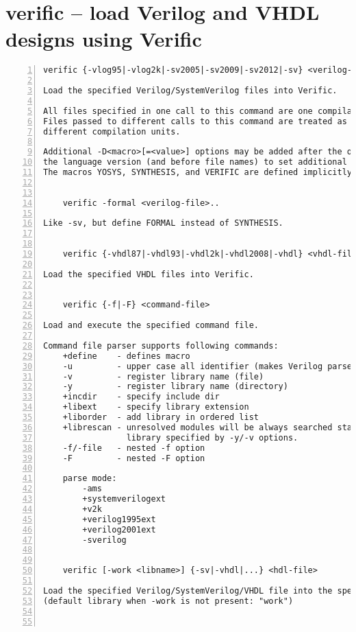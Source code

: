 \section{verific -- load Verilog and VHDL designs using Verific}
\label{cmd:verific}
\begin{lstlisting}[numbers=left,frame=single]
    verific {-vlog95|-vlog2k|-sv2005|-sv2009|-sv2012|-sv} <verilog-file>..

Load the specified Verilog/SystemVerilog files into Verific.

All files specified in one call to this command are one compilation unit.
Files passed to different calls to this command are treated as belonging to
different compilation units.

Additional -D<macro>[=<value>] options may be added after the option indicating
the language version (and before file names) to set additional verilog defines.
The macros YOSYS, SYNTHESIS, and VERIFIC are defined implicitly.


    verific -formal <verilog-file>..

Like -sv, but define FORMAL instead of SYNTHESIS.


    verific {-vhdl87|-vhdl93|-vhdl2k|-vhdl2008|-vhdl} <vhdl-file>..

Load the specified VHDL files into Verific.


    verific {-f|-F} <command-file>

Load and execute the specified command file.

Command file parser supports following commands:
    +define    - defines macro
    -u         - upper case all identifier (makes Verilog parser case insensitive)
    -v         - register library name (file)
    -y         - register library name (directory)
    +incdir    - specify include dir
    +libext    - specify library extension
    +liborder  - add library in ordered list
    +librescan - unresolved modules will be always searched starting with the first
                 library specified by -y/-v options.
    -f/-file   - nested -f option
    -F         - nested -F option

    parse mode:
        -ams
        +systemverilogext
        +v2k
        +verilog1995ext
        +verilog2001ext
        -sverilog


    verific [-work <libname>] {-sv|-vhdl|...} <hdl-file>

Load the specified Verilog/SystemVerilog/VHDL file into the specified library.
(default library when -work is not present: "work")



\end{lstlisting}
